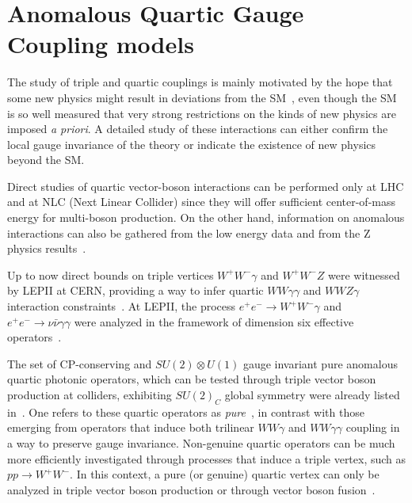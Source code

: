 \clearpage{}
\section{Anomalous Quartic Gauge Coupling models}
\label{sec:aQGCth}

The study of triple and quartic couplings is mainly motivated by the
hope that some new physics might result in deviations from the
SM~\cite{Eboli:2006wa}, even though the SM is so well measured that
very strong restrictions on the kinds of new physics are imposed
\textit{a priori}. A detailed study of these interactions can either 
confirm the local gauge invariance of the theory or indicate the 
existence of new physics beyond the SM. 

Direct studies of quartic vector-boson interactions can be performed 
only at LHC and at NLC (Next Linear Collider) since they will offer 
sufficient center-of-mass energy for multi-boson production. On the 
other hand, information on anomalous interactions can also be gathered 
from the low energy data and from the Z physics 
results~\cite{Brunstein:1996fz}.

Up to now direct bounds on triple vertices $W^{+}W^{-}\gamma$ and 
$W^{+}W^{-}Z$ were witnessed by LEPII at CERN, providing a way to 
infer quartic $WW\gamma \gamma$ and $WWZ\gamma$ interaction
constraints~\cite{Acciarri:2000en,ALEPH:2005aa}. At LEPII, the process 
$e^{+}e^{-}\to W^{+}W^{-}\gamma$ and 
$e^{+}e^{-}\to \nu \bar{\nu}\gamma \gamma$ were analyzed in the 
framework of dimension six effective 
operators~\cite{Belanger:1992qh,Belanger:1999}.

The set of CP-conserving and $SU(2)\otimes U(1)$ gauge invariant pure 
anomalous quartic photonic operators, which can be tested through 
triple vector boson production at colliders, exhibiting $SU(2)_{C}$ 
global symmetry were already listed in~\cite{Belanger:1999}. One 
refers to these quartic operators as 
\textit{pure}~\cite{Belanger:1992qh, Belanger:1992qi, Baillargeon:1995dg},
in contrast with those emerging from operators that induce both 
trilinear $WW\gamma$ and $WW\gamma\gamma$ coupling in a way to preserve
gauge invariance. Non-genuine quartic operators can be much more
efficiently investigated through processes that induce a triple vertex,
such as $pp\to W^{+}W^{-}$. In this context, a pure (or genuine) quartic
vertex can only be analyzed in triple vector boson production or
through vector boson fusion~\cite{Belanger:1992qh}.


